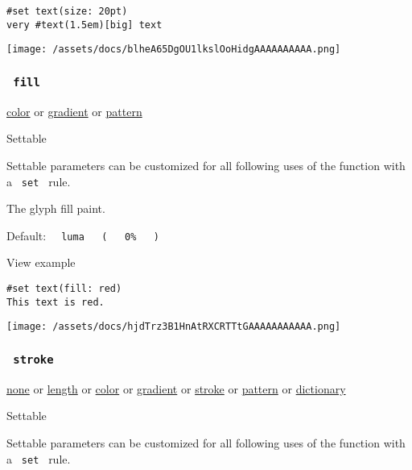 \begin{verbatim}
#set text(size: 20pt)
very #text(1.5em)[big] text
\end{verbatim}

\texttt{[image: /assets/docs/blheA65DgOU1lkslOoHidgAAAAAAAAAA.png]}

\subsubsection{\texorpdfstring{\texttt{\ fill\ }}{ fill }}\label{parameters-fill}

\href{/docs/reference/visualize/color/}{color} {or}
\href{/docs/reference/visualize/gradient/}{gradient} {or}
\href{/docs/reference/visualize/pattern/}{pattern}

{{ Settable }}

\label{parameters-fill-settable-tooltip}
Settable parameters can be customized for all following uses of the
function with a \texttt{\ set\ } rule.

The glyph fill paint.

Default:
\texttt{\ }{\texttt{\ luma\ }}\texttt{\ }{\texttt{\ (\ }}\texttt{\ }{\texttt{\ 0\%\ }}\texttt{\ }{\texttt{\ )\ }}\texttt{\ }


View example

\begin{verbatim}
#set text(fill: red)
This text is red.
\end{verbatim}

\texttt{[image: /assets/docs/hjdTrz3B1HnAtRXCRTTtGAAAAAAAAAAA.png]}

\subsubsection{\texorpdfstring{\texttt{\ stroke\ }}{ stroke }}\label{parameters-stroke}

\href{/docs/reference/foundations/none/}{none} {or}
\href{/docs/reference/layout/length/}{length} {or}
\href{/docs/reference/visualize/color/}{color} {or}
\href{/docs/reference/visualize/gradient/}{gradient} {or}
\href{/docs/reference/visualize/stroke/}{stroke} {or}
\href{/docs/reference/visualize/pattern/}{pattern} {or}
\href{/docs/reference/foundations/dictionary/}{dictionary}

{{ Settable }}

\label{parameters-stroke-settable-tooltip}
Settable parameters can be customized for all following uses of the
function with a \texttt{\ set\ } rule.

